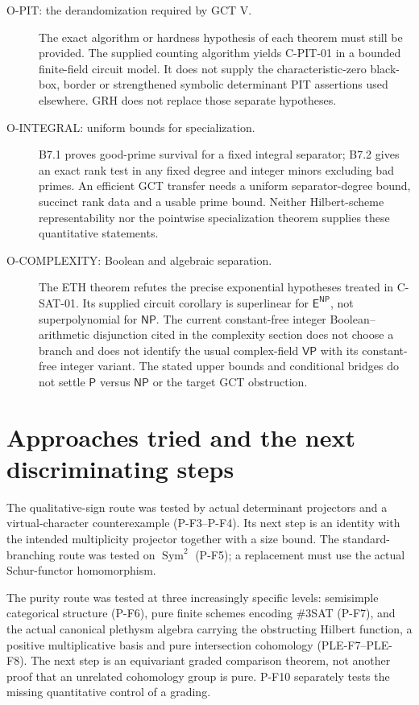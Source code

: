 \begin{description}
\item[O-PIT: the derandomization required by GCT V.]
The exact algorithm or hardness hypothesis of each theorem must still be
provided. The supplied counting algorithm yields C-PIT-01 in a bounded
finite-field circuit model. It does not supply the characteristic-zero
black-box, border or strengthened symbolic determinant PIT assertions
used elsewhere. GRH does not replace those separate hypotheses.

\item[O-INTEGRAL: uniform bounds for specialization.]
B7.1 proves good-prime survival for a fixed integral separator; B7.2 gives
an exact rank test in any fixed degree and integer minors excluding bad
primes. An efficient GCT transfer needs a uniform separator-degree bound,
succinct rank data and a usable prime bound. Neither Hilbert-scheme
representability nor the pointwise specialization theorem supplies these
quantitative statements.

\item[O-COMPLEXITY: Boolean and algebraic separation.]
The ETH theorem refutes the precise exponential hypotheses treated in
C-SAT-01. Its supplied circuit corollary is superlinear for
$\mathsf E^{\mathsf{NP}}$, not superpolynomial for $\mathsf{NP}$.
The current constant-free integer Boolean--arithmetic disjunction cited
in the complexity section does not choose a branch and does not identify
the usual complex-field $\mathsf{VP}$ with its constant-free integer
variant. The stated upper bounds and conditional bridges do not settle
$\mathsf P$ versus $\mathsf{NP}$ or the target GCT obstruction.
\end{description}

\section{Approaches tried and the next discriminating steps}
The qualitative-sign route was tested by actual determinant projectors
and a virtual-character counterexample (P-F3--P-F4). Its next step is an
identity with the intended multiplicity projector together with a size
bound. The standard-branching route was tested on $\operatorname{Sym}^2$
(P-F5); a replacement must use the actual Schur-functor homomorphism.

The purity route was tested at three increasingly specific levels:
semisimple categorical structure (P-F6), pure finite schemes encoding
\#3SAT (P-F7), and the actual canonical plethysm algebra carrying the
obstructing Hilbert function, a positive multiplicative basis and pure
intersection cohomology (PLE-F7--PLE-F8). The next step is an
equivariant graded comparison theorem, not another proof that an unrelated
cohomology group is pure. P-F10 separately tests the missing quantitative
control of a grading.

